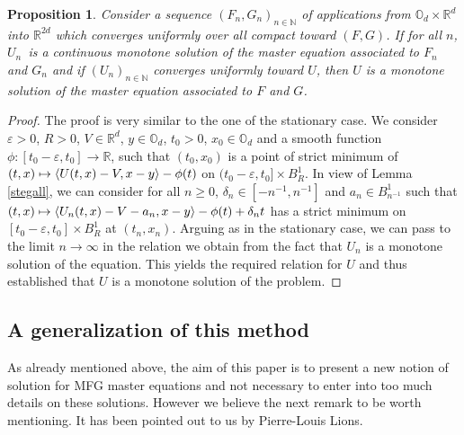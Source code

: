 \documentclass[10pt]{amsart}
\newcommand\mto{\mathchoice{\longmapsto}{\mapsto}{\mapsto}{\mapsto}}
\let\epsilon\varepsilon
\newtheorem{Prop}{Proposition}[section]
\theoremstyle{definition}
\begin{document}
\begin{Prop}\label{propstab}
Consider a sequence $(F_n,G_n)_{n \in \mathbb{N}}$ of applications from $\mathbb{O}_d\times \mathbb{R}^d$ into $\mathbb{R}^{2d}$ which converges uniformly over all compact toward $(F,G)$. If for all $n$, $U_n$~is a continuous monotone solution of the master equation associated to $F_n$ and $G_n$ and if $(U_n)_{n \in \mathbb{N}}$ converges uniformly toward $U$, then $U$ is a monotone solution of the master equation associated to $F$ and $G$.
\end{Prop}
\begin{proof}
The proof is very similar to the one of the stationary case. We consider \hbox{$\epsilon\!>\!0$}, $R >0$, $V \in \mathbb{R}^d$, $y \in \mathbb{O}_d$, $t_0 > 0$, $x_0 \in \mathbb{O}_d$ and a smooth function \hbox{$\phi: [t_0-\epsilon, t_0] \to \mathbb{R}$}, such that $(t_0,x_0)$ is a point of strict minimum of $(t,x) \mto \langle U(t,x)-V, x-y\rangle-\phi(t)$ on $(t_0-\epsilon, t_0] \times B^1_R$. In view of Lemma \ref{stegall}, we can consider for all $n \geq 0$, $\delta_n \in [-n^{-1},n^{-1}]$ and $a_n \in B^1_{n^{-1}}$ such that $(t,x) \mto \langle U_n(t,x)-V-a_n, x-y\rangle-\phi(t)+\delta_n t$ has a strict minimum on $[t_0-\epsilon, t_0] \times B^1_R$
at $(t_n,x_n)$. Arguing as in the stationary case, we can pass to the limit $n \to \infty$ in the relation we obtain from the fact that $U_n$ is a monotone solution of the equation. This yields the required relation for $U$ and thus established that $U$ is a monotone solution of the problem.
\end{proof}

\subsection{A generalization of this method}
As already mentioned above, the aim of this paper is to present a new notion of solution for MFG master equations and not necessary to enter into too much details on these solutions. However we believe the next remark to be worth mentioning. It has been pointed out to us by Pierre-Louis Lions.
\end{document}
